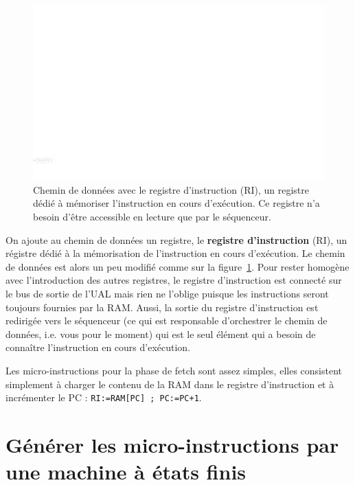 \begin{figure}
\includegraphics[width=\linewidth]{Figs/premier_chemin_ri.pdf}
\caption{\label{fig:premier_chemin_ri} Chemin de données avec le registre d'instruction (RI), un registre dédié à mémoriser l'instruction en cours d'exécution. Ce registre n'a besoin d'être accessible en lecture que par le séquenceur.}
\end{figure}

On ajoute au chemin de données un registre, le \textbf{registre d'instruction} (RI), un régistre dédié à la mémorisation de l'instruction en cours d'exécution. Le chemin de données est alors un peu modifié comme sur la figure~\ref{fig:premier_chemin_ri}. Pour rester homogène avec l'introduction des autres registres, le registre d'instruction est connecté sur le bus de sortie de l'UAL mais rien ne l'oblige puisque les instructions seront toujours fournies par la RAM. Aussi, la sortie du registre d'instruction est redirigée vers le séquenceur (ce qui est responsable d'orchestrer le chemin de données, i.e. vous pour le moment) qui est le seul élément qui a besoin de connaître l'instruction en cours d'exécution. 

Les micro-instructions pour la phase de fetch sont assez simples, elles consistent simplement à charger le contenu de la RAM dans le registre d'instruction et à incrémenter le PC : \texttt{RI:=RAM[PC] ; PC:=PC+1}.

\section{Générer les micro-instructions par une machine à états finis}

